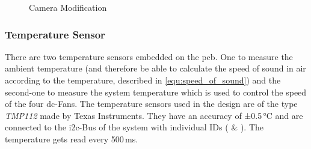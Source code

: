 \begin{figure}[h!]
    \centering
    \qquad
    \caption{Camera Modification}
    \label{fig:camera-modification}
\end{figure}


\subsubsection{Temperature Sensor}
There are two temperature sensors embedded on the \acrshort{pcb}. One to measure the ambient temperature (and therefore be able to calculate the speed of sound in air according to the temperature, described in \ref{equ:speed_of_sound}) and the second-one to measure the system temperature which is used to control the speed of the four \acrshort{dc}-Fans. The temperature sensors used in the design are of the type \textit{TMP112} made by Texas Instruments. They have an accuracy of ±0.5\,°C and are connected to the \acrshort{i2c}-Bus of the system with individual IDs ( \& ). The temperature gets read every 500\,ms.

